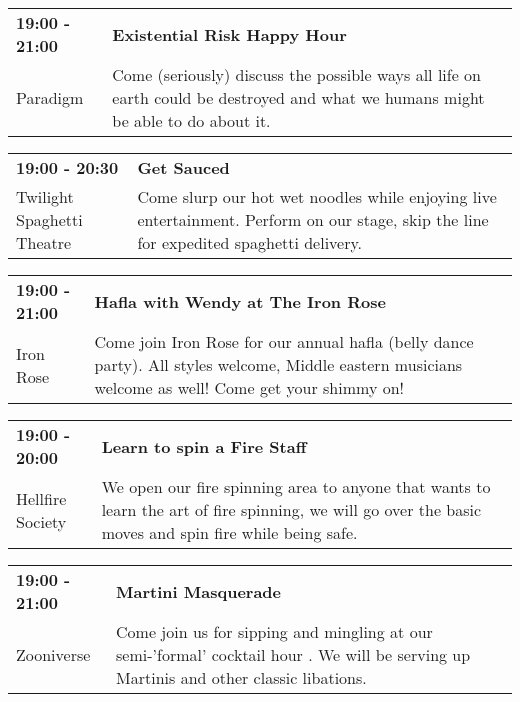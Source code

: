 \begin{tabular}{ p{1in} p{2.2in} }
    \textbf{19:00 - 21:00} & \textbf{Existential Risk Happy Hour} \\
    Paradigm \newline  & Come (seriously) discuss the possible ways all life on earth could be destroyed and what we humans might be able to do about it. \\
    \hline 
\end{tabular}
    
\begin{tabular}{ p{1in} p{2.2in} }
    \textbf{19:00 - 20:30} & \textbf{Get Sauced} \\
    Twilight Spaghetti Theatre \newline  & Come slurp our hot wet noodles while enjoying live entertainment. Perform on our stage, skip the line for expedited spaghetti delivery. \\
    \hline 
\end{tabular}
    
\begin{tabular}{ p{1in} p{2.2in} }
    \textbf{19:00 - 21:00} & \textbf{Hafla with Wendy at The Iron Rose} \\
    Iron Rose \newline  & Come join Iron Rose for our annual hafla (belly dance party). All styles welcome, Middle eastern musicians welcome as well! Come get your shimmy on! \\
    \hline 
\end{tabular}
    
\begin{tabular}{ p{1in} p{2.2in} }
    \textbf{19:00 - 20:00} & \textbf{Learn to spin a Fire Staff} \\
    Hellfire Society \newline  & We open our fire spinning area to anyone that wants to learn the art of fire spinning, we will go over the basic moves and spin fire while being safe. \\
    \hline 
\end{tabular}
    
\begin{tabular}{ p{1in} p{2.2in} }
    \textbf{19:00 - 21:00} & \textbf{Martini Masquerade} \\
    Zooniverse \newline  & Come join us for sipping and mingling at our semi-'formal' cocktail hour . We will be serving up Martinis and other classic libations. \\
    \hline 
\end{tabular}
    
